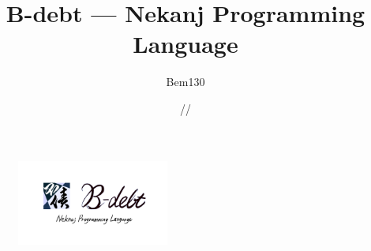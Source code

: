 \documentclass[a4paper,10.5pt]{ltjsarticle}
\begin{document}
\begin{titlepage}

\title{\Huge B-debt --- Nekanj Programming Language}
\author{\LARGE Bem130}
\date{\number\year \slash \number\month \slash \number\day}

\maketitle


\tableofcontents


\begin{figure}[b]
    \includegraphics[width=5cm]{./logo/npl-all.png}
\end{figure}
\end{titlepage}



\end{document}

